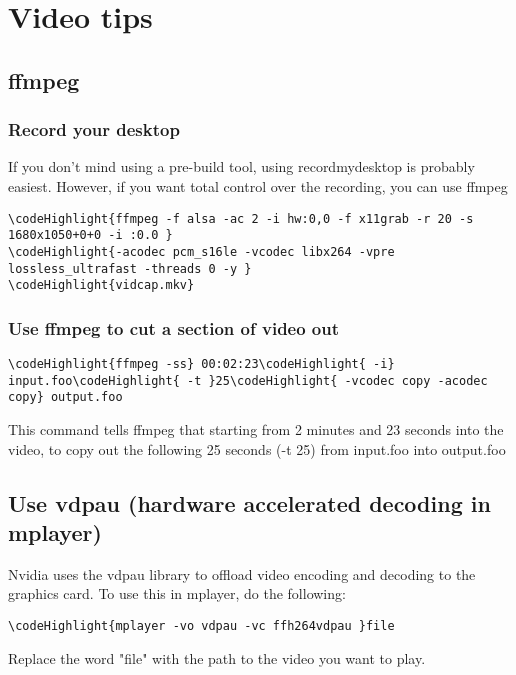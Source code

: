 \documentclass[12pt,a4paper]{article}
\begin{document}
\section{Video tips}
\subsection{ffmpeg}
\subsubsection{Record your desktop}
If you don't mind using a pre-build tool, using recordmydesktop is probably easiest. However, if you want total control over the recording, you can use ffmpeg
\begin{Verbatim}[commandchars=\\\{\}]
\codeHighlight{ffmpeg -f alsa -ac 2 -i hw:0,0 -f x11grab -r 20 -s 1680x1050+0+0 -i :0.0 }
\codeHighlight{-acodec pcm_s16le -vcodec libx264 -vpre lossless_ultrafast -threads 0 -y }
\codeHighlight{vidcap.mkv}
\end{Verbatim}

\subsubsection{Use ffmpeg to cut a section of video out}
\begin{Verbatim}[commandchars=\\\{\}]
\codeHighlight{ffmpeg -ss} 00:02:23\codeHighlight{ -i} input.foo\codeHighlight{ -t }25\codeHighlight{ -vcodec copy -acodec copy} output.foo
\end{Verbatim}
This command tells ffmpeg that starting from 2 minutes and 23 seconds into the video, to copy out the following 25 seconds (-t 25) from input.foo into output.foo

\subsection{Use vdpau (hardware accelerated decoding in mplayer)}
Nvidia uses the vdpau library to offload video encoding and decoding to the graphics card.  To use this in mplayer, do the following:
\begin{Verbatim}[commandchars=\\\{\}]
\codeHighlight{mplayer -vo vdpau -vc ffh264vdpau }file
\end{Verbatim}
Replace the word "file" with the path to the video you want to play.
\end{document}
